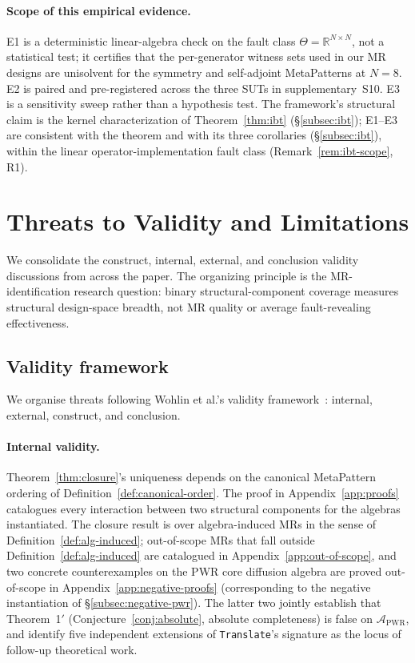 \documentclass[acmsmall,screen,review]{acmart}
\begin{document}
\paragraph{Scope of this empirical evidence.}
E1 is a deterministic linear-algebra check on the fault class $\Theta = \mathbb{R}^{N \times N}$, not a statistical test; it certifies that the per-generator witness sets used in our MR designs are unisolvent for the symmetry and self-adjoint MetaPatterns at $N = 8$. E2 is paired and pre-registered across the three SUTs in supplementary~S10. E3 is a sensitivity sweep rather than a hypothesis test. The framework's structural claim is the kernel characterization of Theorem~\ref{thm:ibt} (\S\ref{subsec:ibt}); E1--E3 are consistent with the theorem and with its three corollaries (\S\ref{subsec:ibt}), within the linear operator-implementation fault class (Remark~\ref{rem:ibt-scope}, R1).


\section{Threats to Validity and Limitations}
\label{sec:threats-limitations}

We consolidate the construct, internal, external, and conclusion validity discussions from across the paper. The organizing principle is the MR-identification research question: binary structural-component coverage measures structural design-space breadth, not MR quality or average fault-revealing effectiveness.

\subsection{Validity framework}

We organise threats following Wohlin et al.'s validity framework~\cite{Wohlin2012EmpiricalSE}: internal, external, construct, and conclusion.

\paragraph{Internal validity.} Theorem~\ref{thm:closure}'s uniqueness depends on the canonical MetaPattern ordering of Definition~\ref{def:canonical-order}. The proof in Appendix~\ref{app:proofs} catalogues every interaction between two structural components for the algebras instantiated. The closure result is over algebra-induced MRs in the sense of Definition~\ref{def:alg-induced}; out-of-scope MRs that fall outside Definition~\ref{def:alg-induced} are catalogued in Appendix~\ref{app:out-of-scope}, and two concrete counterexamples on the PWR core diffusion algebra are proved out-of-scope in Appendix~\ref{app:negative-proofs} (corresponding to the negative instantiation of \S\ref{subsec:negative-pwr}). The latter two jointly establish that Theorem~1$'$ (Conjecture~\ref{conj:absolute}, absolute completeness) is false on $\mathcal{A}_{\mathrm{PWR}}$, and identify five independent extensions of \texttt{Translate}'s signature as the locus of follow-up theoretical work.
\end{document}
